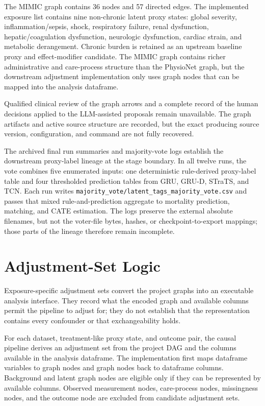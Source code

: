 The MIMIC graph contains 36 nodes and 57 directed edges.  The implemented exposure list contains nine non-chronic latent proxy states: global severity, inflammation/sepsis, shock, respiratory failure, renal dysfunction, hepatic/coagulation dysfunction, neurologic dysfunction, cardiac strain, and metabolic derangement.  Chronic burden is retained as an upstream baseline proxy and effect-modifier candidate.  The MIMIC graph contains richer administrative and care-process structure than the PhysioNet graph, but the downstream adjustment implementation only uses graph nodes that can be mapped into the analysis dataframe.

Qualified clinical review of the graph arrows and a complete record of the human decisions applied to the LLM-assisted proposals remain unavailable.  The graph artifacts and active source structure are recorded, but the exact producing source version, configuration, and command are not fully recovered.

The archived final run summaries and majority-vote logs establish the downstream proxy-label lineage at the stage boundary.  In all twelve runs, the vote combines five enumerated inputs: one deterministic rule-derived proxy-label table and four thresholded prediction tables from GRU, GRU-D, STraTS, and TCN.  Each run writes \nolinkurl{majority_vote/latent_tags_majority_vote.csv} and passes that mixed rule-and-prediction aggregate to mortality prediction, matching, and CATE estimation.  The logs preserve the external absolute filenames, but not the voter-file bytes, hashes, or checkpoint-to-export mappings; those parts of the lineage therefore remain incomplete.

\section{Adjustment-Set Logic}
\label{sec:causal-graph-effect-estimation-methodology:adjustment-set-logic}
Exposure-specific adjustment sets convert the project graphs into an executable analysis interface.  They record what the encoded graph and available columns permit the pipeline to adjust for; they do not establish that the representation contains every confounder or that exchangeability holds.

For each dataset, treatment-like proxy state, and outcome pair, the causal pipeline derives an adjustment set from the project DAG and the columns available in the analysis dataframe.  The implementation first maps dataframe variables to graph nodes and graph nodes back to dataframe columns.  Background and latent graph nodes are eligible only if they can be represented by available columns.  Observed measurement nodes, care-process nodes, missingness nodes, and the outcome node are excluded from candidate adjustment sets.

